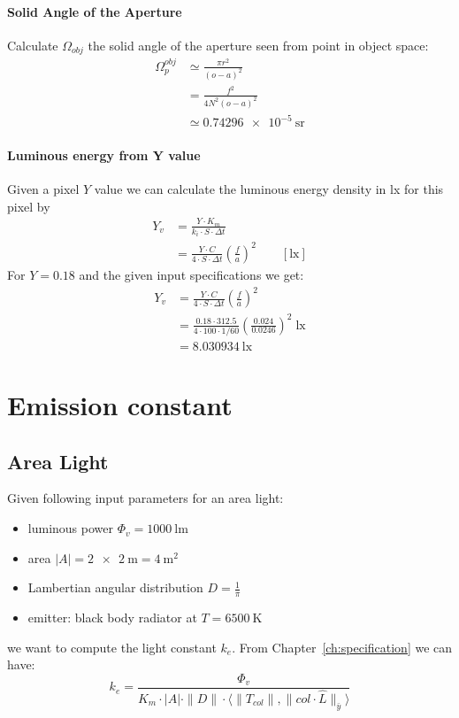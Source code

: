 \fi

\paragraph{Solid Angle of the Aperture}
Calculate $\Omega_{obj}$ the solid angle of the aperture seen from point in object space:
\begin{align*}
\Omega_p^{obj} &\simeq \frac{\pi r^2}{(o-a)^2}\\
&= \frac{f^2}{4N^2(o-a)^2}\\
&\simeq  \SI{0.74296e-5}{\steradian}
\end{align*}

\paragraph{Luminous energy from Y value}

Given a pixel $Y$ value we can calculate the luminous energy density in \si{\lux} for this pixel by
\begin{align*}
Y_v &= \frac{Y\cdot K_m}{ k_i\cdot S \cdot \Delta t} \\
&= \frac{Y\cdot C}{ 4\cdot S \cdot \Delta t} \left(\frac{f}{a}\right)^2
\qquad [\si{\lux}]
\end{align*}
For $Y=0.18$ and the given input specifications we get:
\begin{align*}
Y_v &= \frac{Y\cdot C}{ 4\cdot S \cdot \Delta t} \left(\frac{f}{a}\right)^2 \\
&= \frac{0.18\cdot 312.5}{ 4\cdot 100 \cdot 1/60} \left(\frac{0.024}{0.0246}\right)^2 \;\si{\lux} \\
&= \SI{8.030934}{\lux}
\end{align*}

\section{Emission constant}

\subsection{Area Light}
Given following input parameters for an area light:
\begin{itemize}
\item luminous power $\Phi_v=\SI{1000}{\lumen}$
\item area $|A|= \SI{2 x 2}{\meter} = \SI{4}{\square\meter}$
\item Lambertian angular distribution $D = \frac1{\pi}$
\item emitter: black body radiator at $T=\SI{6500}{\kelvin}$
\end{itemize}
we want to compute the light constant $k_e$. From Chapter~\ref{ch:specification} we can  have:
\begin{displaymath}
 k_e = \frac{\Phi_v}{K_m \cdot |A| \cdot \|D\| \cdot \langle \|T_{col}\|, \|col\cdot\hat{L}\|_{\bar y} \rangle }
\end{displaymath}

